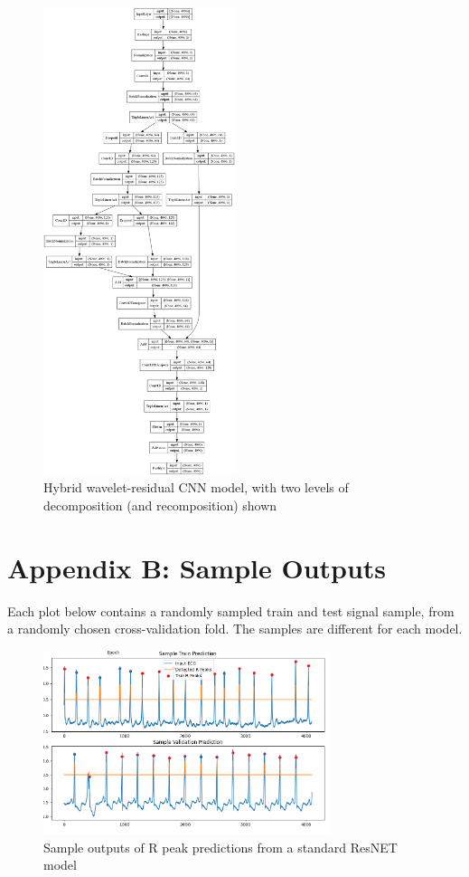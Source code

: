 \documentclass[9pt,conference]{IEEEtran}
\begin{document}
\begin{figure}
    \centering
    \includegraphics[width=0.5\textwidth]{wavelet_resid.png}
    \caption{Hybrid wavelet-residual CNN model, with two levels of decomposition (and recomposition) shown}
\end{figure}

\clearpage

\section*{Appendix B: Sample Outputs}
Each plot below contains a randomly sampled train and test signal sample, from a randomly chosen cross-validation fold. The samples are different for each model.

\begin{figure}[H]
\centering\includegraphics[width = 0.75\textwidth]{resnetPreds.png}
\caption{\label{fig:resNetPreds} Sample outputs of R peak predictions from a standard ResNET model}
\end{figure}
\end{document}
